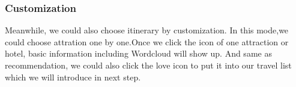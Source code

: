\documentclass[10pt]{article}
\begin{document}
\subsubsection{Customization}
Meanwhile, we could also choose itinerary by customization. In this mode,we could choose attration one by one.Once we click the icon of one attraction or hotel, basic information including Wordcloud will show up. And same as recommendation, we could also click the love icon to put it into our travel list which we will introduce in next step.

\begin{figure}[H]
	\centering
	\quad

\end{figure}
\end{document}
